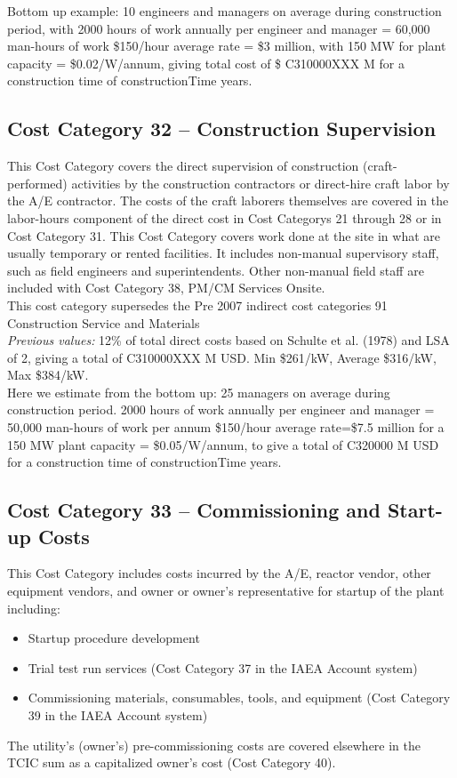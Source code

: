 Bottom up example: 10 engineers and managers on average during construction period, with 2000 hours of work annually per engineer and manager = 60,000 man-hours of work \$150/hour average rate = \$3 million, with 150 MW for plant capacity = \$0.02/W/annum, giving total cost of \$ C310000XXX M for a construction time of constructionTime years.


\subsection*{Cost Category 32 – Construction Supervision}
This Cost Category covers the direct supervision of construction (craft-performed) activities by the construction contractors or direct-hire craft labor by the A/E contractor. The costs of the craft laborers themselves are covered in the labor-hours component of the direct cost in Cost Categorys 21 through 28 or in Cost Category 31. This Cost Category covers work done at the site in what are usually temporary or rented facilities. It includes non-manual supervisory staff, such as field engineers and superintendents. Other non-manual field staff are included with Cost Category 38, PM/CM Services Onsite.\\

This cost category supersedes the Pre 2007 indirect cost categories 91 Construction Service and Materials  \\

\emph{Previous values: }
12\% of total direct costs based on Schulte et al. (1978) and LSA of 2, giving a total of C310000XXX M USD. Min \$261/kW, Average \$316/kW, Max \$384/kW. \\

Here we estimate from the bottom up: 25 managers on average during construction period. 2000 hours of work annually per engineer and manager = 50,000 man-hours of work per annum \$150/hour average rate=\$7.5 million for a 150 MW plant capacity = \$0.05/W/annum, to give a total of C320000 M USD for a construction time of constructionTime years.

\subsection*{Cost Category 33 – Commissioning and Start-up Costs}
This Cost Category includes costs incurred by the A/E, reactor vendor, other equipment vendors, and owner or owner’s representative for startup of the plant including:
\begin{itemize}
    \item Startup procedure development
    \item Trial test run services (Cost Category 37 in the IAEA Account system)
    \item Commissioning materials, consumables, tools, and equipment (Cost Category 39 in the IAEA Account system)
\end{itemize}
The utility’s (owner’s) pre-commissioning costs are covered elsewhere in the TCIC sum as a capitalized owner’s cost (Cost Category 40).

